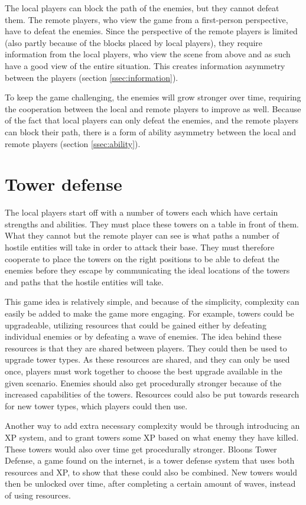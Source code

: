 	The local players can block the path of the enemies, but they cannot defeat
	them. The remote players, who view the game from a first-person perspective,
	have to defeat the enemies. Since the perspective of the remote players is
	limited (also partly because of the blocks placed by local players), they
	require information from the local players, who view the scene from above
	and as such have a good view of the entire situation. This creates
	information asymmetry between the players (section \ref{ssec:information}).

	To keep the game challenging, the enemies will grow stronger over time,
	requiring the cooperation between the local and remote players to improve
	as well. Because of the fact that local players can only defeat the enemies,
	and the remote players can block their path, there is a form of ability
	asymmetry between the local and remote players (section \ref{ssec:ability}).

\section{Tower defense} \label{sec:towerdefense}
	The local players start off with a number of towers each
	which have certain strengths and abilities. They must place
	these towers on a table in front of them. What they cannot
	but the remote player can see is what paths a number of
	hostile entities will take in order to attack their base.
	They must therefore cooperate to place the towers on the right
	positions to be able to defeat the enemies before they escape
	by communicating the ideal locations of the
	towers and paths that the hostile entities will take.

	This game idea is relatively simple, and because of the simplicity,
	complexity can easily be added to make the game more engaging. For
	example, towers could be upgradeable, utilizing resources that
	could be gained either by defeating individual enemies or by defeating
	a wave of enemies. The idea behind these resources is that they are 
	shared between players. They could then be used to upgrade
	tower types. As these resources are shared, and they can only be
	used once, players must work together to choose the best upgrade
	available in the given scenario. Enemies should also get procedurally
	stronger because of the increased capabilities of the towers. Resources
	could also be put towards research for new tower types, which players 
	could then use.
	
	Another way to add extra necessary complexity would be through
	introducing an XP system, and to grant towers some XP based on what enemy
	they have killed. These towers would also over time get procedurally
	stronger. Bloons Tower Defense, a game found on the internet, is a tower
	defense system that uses both resources and XP, to show that these could
	also be combined.  New towers would then be unlocked over time, after
	completing a certain amount of waves, instead of using resources.

